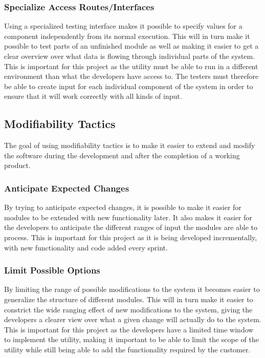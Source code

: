 \subsubsection{Specialize Access Routes/Interfaces}
Using a specialized testing interface makes it possible to specify values for a component independently from its normal execution. This will in turn make it possible to test parts of an unfinished module as well as making it easier to get a clear overview over what data is flowing through individual parts of the system. This is important for this project as the \gls{utility} must be able to run in a different environment than what the developers have access to. The testers must therefore be able to create input for each individual component of the system in order to ensure that it will work correctly with all kinds of input. 

\subsection{Modifiability Tactics}
The goal of using modifiability tactics is to make it easier to extend and modify the software during the development and after the completion of a working product.

\subsubsection{Anticipate Expected Changes}
By trying to anticipate expected changes, it is possible to make it easier for modules to be extended with new functionality later. It also makes it easier for the developers to anticipate the different ranges of input the modules are able to process. This is important for this project as it is being developed incrementally, with new functionality and code added every sprint.

\subsubsection{Limit Possible Options}
By limiting the range of possible modifications to the system it becomes easier to generalize the structure of different modules. This will in turn make it easier to constrict the wide ranging effect of new modifications to the system, giving the developers a clearer view over what a given change will actually do to the system. This is important for this project as the developers have a limited time window to implement the \gls{utility}, making it important to be able to limit the scope of the \gls{utility} while still being able to add the functionality required by the customer.

